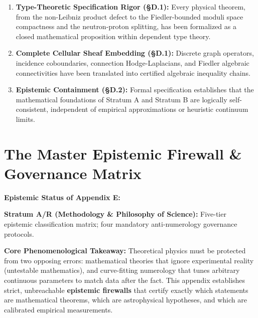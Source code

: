 \documentclass[
    12pt,
    a4paper,
    headings=normal,
    twoside=false,
    open=any,
    parskip=half
]{scrbook}
\begin{document}
\begin{tcolorbox}[colback=maincolor!3!white, colframe=maincolor!80!black, title={\textbf{Grand Synthesis of Appendix D}}]
\begin{enumerate}[leftmargin=1.5em, itemsep=5pt]
    \item \textbf{Type-Theoretic Specification Rigor (§D.1):} Every physical theorem, from the non-Leibniz product defect to the Fiedler-bounded moduli space compactness and the neutron-proton splitting, has been formalized as a closed mathematical proposition within dependent type theory.
    \item \textbf{Complete Cellular Sheaf Embedding (§D.1):} Discrete graph operators, incidence coboundaries, connection Hodge-Laplacians, and Fiedler algebraic connectivities have been translated into certified algebraic inequality chains.
    \item \textbf{Epistemic Containment (§D.2):} Formal specification establishes that the mathematical foundations of Stratum A and Stratum B are logically self-consistent, independent of empirical approximations or heuristic continuum limits.
\end{enumerate}
\end{tcolorbox}

\chapter{The Master Epistemic Firewall \& Governance Matrix}
\label{app:master_epistemic_firewall_governance}

\begin{firewallbox}
\textbf{Epistemic Status of Appendix E:}\par\smallskip\noindent
\textbf{Stratum A/R (Methodology \& Philosophy of Science):} Five-tier epistemic classification matrix; four mandatory anti-numerology governance protocols.\par\smallskip\noindent
\textbf{Core Phenomenological Takeaway:} Theoretical physics must be protected from two opposing errors: mathematical theories that ignore experimental reality (untestable mathematics), and curve-fitting numerology that tunes arbitrary continuous parameters to match data after the fact. This appendix establishes strict, unbreachable \textbf{epistemic firewalls} that certify exactly which statements are mathematical theorems, which are astrophysical hypotheses, and which are calibrated empirical measurements.
\end{firewallbox}
\end{document}
